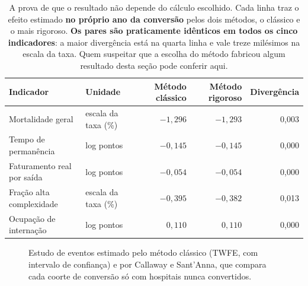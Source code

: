 \begin{table}[H]
\centering
\caption{A prova de que o resultado não depende do cálculo escolhido. Cada
linha traz o efeito estimado \textbf{no próprio ano da conversão} pelos
dois métodos, o clássico e o mais rigoroso. \textbf{Os pares são
praticamente idênticos em todos os cinco indicadores}: a maior divergência
está na quarta linha e vale treze milésimos na escala da taxa. Quem
suspeitar que a escolha do método fabricou algum resultado desta seção
pode conferir aqui.}
\label{tab:cstwfezero}
\small
\begin{tabular}{llrrr}
\toprule
Indicador & Unidade & Método clássico & Método rigoroso & Divergência \\
\midrule
Mortalidade geral          & escala da taxa (\%) & $-1{,}296$ & $-1{,}293$ & 0,003 \\
Tempo de permanência       & log pontos         & $-0{,}145$ & $-0{,}145$ & 0,000 \\
Faturamento real por saída & log pontos         & $-0{,}054$ & $-0{,}054$ & 0,000 \\
Fração alta complexidade   & escala da taxa (\%) & $-0{,}395$ & $-0{,}382$ & 0,013 \\
Ocupação de internação     & log pontos         & $0{,}110$  & $0{,}110$  & 0,000 \\
\bottomrule
\end{tabular}
\end{table}


\begin{figure}[H]
\centering
{}
\caption{Estudo de eventos estimado pelo método clássico (TWFE, com
intervalo de confiança) e por Callaway e Sant'Anna, que compara cada
coorte de conversão só com hospitais nunca convertidos.}
\label{fig:cstwfe}
\end{figure}

